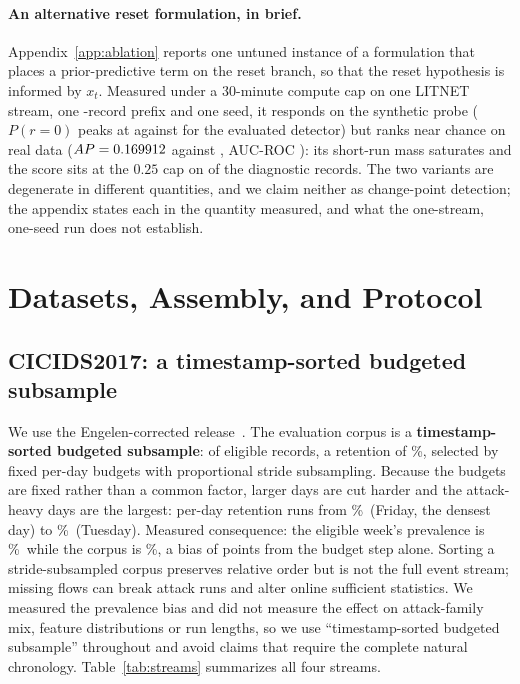 \documentclass[manuscript,screen,nonacm]{acmart}
\begin{document}
\paragraph{An alternative reset formulation, in brief.}
Appendix~\ref{app:ablation} reports one untuned instance of a formulation that
places a prior-predictive term on the reset branch, so that the reset
hypothesis is informed by $x_t$. Measured under a 30-minute compute cap on one
LITNET stream, one \SSixPrefixRows-record prefix and one seed, it responds on
the synthetic probe ($P(r{=}0)$ peaks at \SSixProbeCorrectedPeak{} against
\SSixProbeOriginalPeak{} for the evaluated detector) but ranks near chance on
real data ($AP=0.169912$ against \SSixOriginalAucpr, AUC-ROC
\SSixCorrectedAucroc): its short-run mass saturates and the score sits at the
$0.25$ cap on \SSixDiagCorrectedFracAtCap{} of the diagnostic records. The two
variants are degenerate in different quantities, and we claim neither as
change-point detection; the appendix states each in the quantity measured, and
what the one-stream, one-seed run does not establish.

\section{Datasets, Assembly, and Protocol}
\label{sec:streams}

\subsection{CICIDS2017: a timestamp-sorted budgeted subsample}
We use the Engelen-corrected release~\citep{engelen2021cicids}. The evaluation
corpus is a \textbf{timestamp-sorted budgeted subsample}: \CicidsWeekUsedRows{}
of \CicidsWeekEligibleRows{} eligible records, a retention of
\CicidsWeekRetentionPct\%, selected by fixed per-day budgets with proportional
stride subsampling. Because the budgets are fixed rather than a common factor,
larger days are cut harder and the attack-heavy days are the largest: per-day
retention runs from \CicidsWeekMinDayRetentionPct\%\ (Friday, the densest day)
to \CicidsWeekMaxDayRetentionPct\%\ (Tuesday). Measured consequence: the
eligible week's prevalence is \CicidsWeekTruePrevalencePct\%\ while the corpus
is \CicidsWeekUsedPrevalencePct\%, a bias of \CicidsWeekPrevalenceBiasPp{}
points from the budget step alone. Sorting a stride-subsampled corpus preserves
relative order but is not the full event stream; missing flows can break attack
runs and alter online sufficient statistics. We measured the prevalence bias
and did not measure the effect on attack-family mix, feature distributions or
run lengths, so we use ``timestamp-sorted budgeted subsample'' throughout and
avoid claims that require the complete natural chronology.
Table~\ref{tab:streams} summarizes all four streams.
\end{document}
